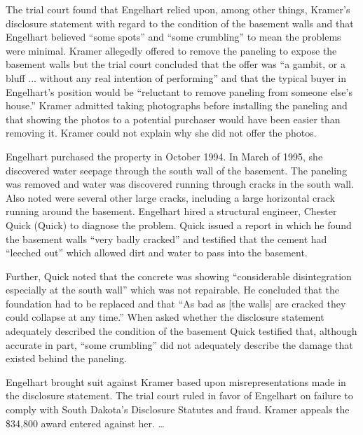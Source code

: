 The trial court found that Engelhart relied upon, among other things, Kramer's
disclosure statement with regard to the condition of the basement walls and
that Engelhart believed ``some spots'' and ``some crumbling'' to mean the
problems were minimal. Kramer allegedly offered to remove the paneling to
expose the basement walls but the trial court concluded that the offer was ``a
gambit, or a bluff ... without any real intention of performing'' and that the
typical buyer in Engelhart's position would be ``reluctant to remove paneling
from someone else's house.'' Kramer admitted taking photographs before
installing the paneling and that showing the photos to a potential purchaser
would have been easier than removing it. Kramer could not explain why she did
not offer the photos.

Engelhart purchased the property in October 1994. In March of 1995, she
discovered water seepage through the south wall of the basement. The paneling
was removed and water was discovered running through cracks in the south wall.
Also noted were several other large cracks, including a large horizontal crack
running around the basement. Engelhart hired a structural engineer, Chester
Quick (Quick) to diagnose the problem. Quick issued a report in which he found
the basement walls ``very badly cracked'' and testified that the cement had
``leeched out'' which allowed dirt and water to pass into the
basement.

Further, Quick noted that the concrete was showing ``considerable disintegration
especially at the south wall'' which was not repairable. He concluded that the
foundation had to be replaced and that ``As bad as [the walls] are cracked they
could collapse at any time.'' When asked whether the disclosure statement
adequately described the condition of the basement Quick testified that,
although accurate in part, ``some crumbling'' did not adequately describe the
damage that existed behind the paneling.

Engelhart brought suit against Kramer based upon misrepresentations made in the
disclosure statement. The trial court ruled in favor of Engelhart on failure to
comply with South Dakota's Disclosure Statutes and fraud. Kramer appeals the
\$34,800 award entered against her. \dots{}


